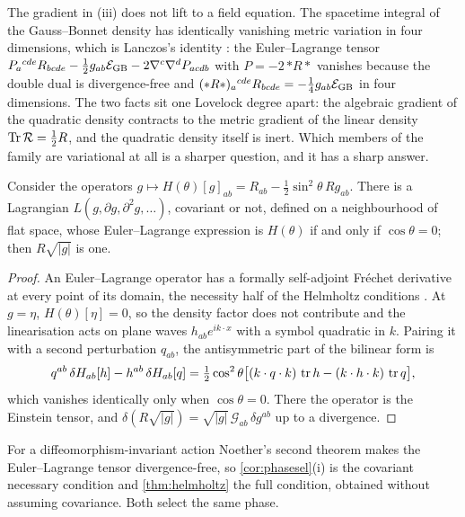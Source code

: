 The gradient in (iii) does not lift to a field equation. The spacetime integral of the Gauss--Bonnet density has identically vanishing metric variation in four
dimensions, which is Lanczos's identity \cite{Lanczos38,Lovelock71}: the Euler--Lagrange tensor $P_a{}^{cde}R_{bcde}-\tfrac12g_{ab}\mathcal E_{\rm GB}-2\nabla^c\nabla^dP_{acdb}$ with
$P=-2\,{*R*}$ vanishes because the double dual is divergence-free and $(*R*)_a{}^{cde}R_{bcde}=-\tfrac14g_{ab}\mathcal E_{\rm GB}$ in four dimensions. The two facts sit one
Lovelock degree apart: the algebraic gradient of the quadratic density contracts to the metric gradient of the linear density $\operatorname{Tr}\mathcal R=\tfrac12R$, and the quadratic
density itself is inert. Which members of the family are variational at all is a sharper question, and it has a sharp answer.

\begin{theorem}
\label{thm:helmholtz}
Consider the operators $g\mapsto H(\theta)[g]_{ab}=R_{ab}-\tfrac12\sin^2\theta\,Rg_{ab}$. There is a Lagrangian $L(g,\partial g,\partial^2g,\dots)$, covariant or not, defined
on a neighbourhood of flat space, whose Euler--Lagrange expression is $H(\theta)$ if and only if $\cos\theta=0$; then $R\sqrt{|g|}$ is one.
\end{theorem}

\begin{proof}
An Euler--Lagrange operator has a formally self-adjoint Fr\'echet derivative at every point of its domain, the necessity half of the Helmholtz conditions
\cite{Vainberg64,Olver93}. At $g=\eta$, $H(\theta)[\eta]=0$, so the density factor does not contribute and the linearisation acts on plane waves $h_{ab}e^{ik\cdot x}$ with a
symbol quadratic in $k$. Pairing it with a second perturbation $q_{ab}$, the antisymmetric part of the bilinear form is
\[
q^{ab}\,\delta H_{ab}[h]-h^{ab}\,\delta H_{ab}[q]=\tfrac12\cos^2\theta\bigl[(k\cdot q\cdot k)\,\operatorname{tr} h-(k\cdot h\cdot k)\,\operatorname{tr} q\bigr],
\]
which vanishes identically only when $\cos\theta=0$. There the operator is the Einstein tensor, and $\delta(R\sqrt{|g|})=\sqrt{|g|}\,\mathcal G_{ab}\,\delta g^{ab}$ up to a
divergence.
\end{proof}

For a diffeomorphism-invariant action Noether's second theorem makes the Euler--Lagrange tensor divergence-free, so \cref{cor:phasesel}(i) is the covariant
necessary condition and \cref{thm:helmholtz} the full condition, obtained without assuming covariance. Both select the same phase.

